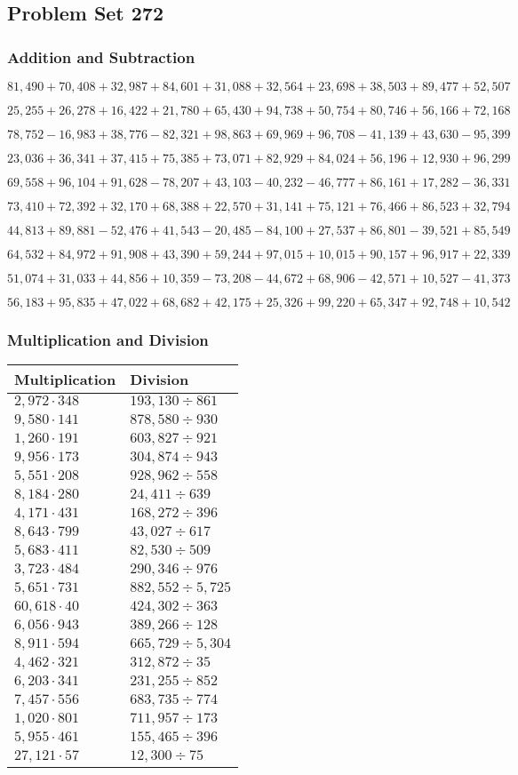 \hypertarget{problem-set-272}{%
\subsection{Problem Set 272}\label{problem-set-272}}

\hypertarget{addition-and-subtraction}{%
\subsubsection{Addition and
Subtraction}\label{addition-and-subtraction}}

\(81,490+70,408+32,987+84,601+31,088+32,564+23,698+38,503+89,477+52,507\)

\(25,255+26,278+16,422+21,780+65,430+94,738+50,754+80,746+56,166+72,168\)

\(78,752-16,983+38,776-82,321+98,863+69,969+96,708-41,139+43,630-95,399\)

\(23,036+36,341+37,415+75,385+73,071+82,929+84,024+56,196+12,930+96,299\)

\(69,558+96,104+91,628-78,207+43,103-40,232-46,777+86,161+17,282-36,331\)

\(73,410+72,392+32,170+68,388+22,570+31,141+75,121+76,466+86,523+32,794\)

\(44,813+89,881-52,476+41,543-20,485-84,100+27,537+86,801-39,521+85,549\)

\(64,532+84,972+91,908+43,390+59,244+97,015+10,015+90,157+96,917+22,339\)

\(51,074+31,033+44,856+10,359-73,208-44,672+68,906-42,571+10,527-41,373\)

\(56,183+95,835+47,022+68,682+42,175+25,326+99,220+65,347+92,748+10,542\)

\hypertarget{multiplication-and-division}{%
\subsubsection{Multiplication and
Division}\label{multiplication-and-division}}

\begin{longtable}[]{@{}ll@{}}
\toprule
Multiplication & Division\tabularnewline
\midrule
\endhead
\(2,972\cdot348\) & \(193,130÷861\)\tabularnewline
\(9,580\cdot141\) & \(878,580÷930\)\tabularnewline
\(1,260\cdot191\) & \(603,827÷921\)\tabularnewline
\(9,956\cdot173\) & \(304,874÷943\)\tabularnewline
\(5,551\cdot208\) & \(928,962÷558\)\tabularnewline
\(8,184\cdot280\) & \(24,411÷639\)\tabularnewline
\(4,171\cdot431\) & \(168,272÷396\)\tabularnewline
\(8,643\cdot799\) & \(43,027÷617\)\tabularnewline
\(5,683\cdot411\) & \(82,530÷509\)\tabularnewline
\(3,723\cdot484\) & \(290,346÷976\)\tabularnewline
\(5,651\cdot731\) & \(882,552÷5,725\)\tabularnewline
\(60,618\cdot40\) & \(424,302÷363\)\tabularnewline
\(6,056\cdot943\) & \(389,266÷128\)\tabularnewline
\(8,911\cdot594\) & \(665,729÷5,304\)\tabularnewline
\(4,462\cdot321\) & \(312,872÷35\)\tabularnewline
\(6,203\cdot341\) & \(231,255÷852\)\tabularnewline
\(7,457\cdot556\) & \(683,735÷774\)\tabularnewline
\(1,020\cdot801\) & \(711,957÷173\)\tabularnewline
\(5,955\cdot461\) & \(155,465÷396\)\tabularnewline
\(27,121\cdot57\) & \(12,300÷75\)\tabularnewline
\bottomrule
\end{longtable}
